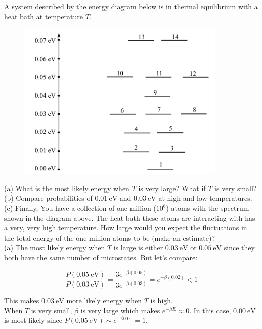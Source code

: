 \begin{texample}
	A system described by the energy diagram below is in thermal equilibrium with a heat bath at temperature $T$.
	
	\begin{figure}[H]
		\centering
		\includegraphics[width=100mm]{28.png}
	\end{figure}
	
	(a) What is the most likely energy when $T$ is very large? What if $T$ is very small? (b) Compare probabilities of $\SI{0.01}{\electronvolt}$ and $\SI{0.03}{\electronvolt}$ at high and low temperatures. (c) Finally, You have a collection of one million ($10^6$) atoms with the spectrum shown in the diagram above. The heat bath these atoms are interacting with has a very, very high temperature.  How large would you expect the fluctuations in the total energy of the one million atoms to be (make an estimate)? \\
	
	(a) The most likely energy when $T$ is large is either $\SI{0.03}{\electronvolt}$ or $\SI{0.05}{\electronvolt}$ since they both have the same number of microstates. But let's compare:
	
	\[ \frac{P(\SI{0.05}{\electronvolt})}{P(\SI{0.03}{\electronvolt})} = \frac{3e^{-\beta(0.05)}}{3e^{-\beta(0.03)}} = e^{-\beta(0.02)} < 1 \]
	
	This makes $\SI{0.03}{\electronvolt}$ more likely energy when $T$ is high. \\
	
	When $T$ is very small, $\beta$ is very large which makes $e^{-\beta E} \approx 0$. In this case, $\SI{0.00}{\electronvolt}$ is most likely since $P(\SI{0.05}{\electronvolt})\sim e^{-\beta 0.00}=1$. \\
	

\end{texample}
